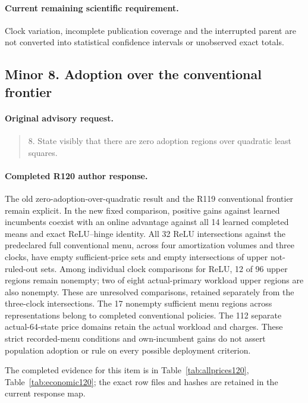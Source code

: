 \paragraph{Current remaining scientific requirement.}
Clock variation, incomplete publication coverage and the interrupted parent are not converted into statistical confidence intervals or unobserved exact totals.

\subsection{Minor 8. Adoption over the conventional frontier}
\label{response122:minor-8}

\paragraph{Original advisory request.}
\begin{quote}
8. State visibly that there are zero adoption regions over quadratic least squares.
\end{quote}

\paragraph{Completed R120 author response.}
The old zero-adoption-over-quadratic result and the R119 conventional frontier remain explicit. In the new fixed comparison, positive gains against learned incumbents coexist with an online advantage against all 14 learned completed means and exact ReLU--hinge identity. All 32 ReLU intersections against the predeclared full conventional menu, across four amortization volumes and three clocks, have empty sufficient-price sets and empty intersections of upper not-ruled-out sets. Among individual clock comparisons for ReLU, 12 of 96 upper regions remain nonempty; two of eight actual-primary workload upper regions are also nonempty. These are unresolved comparisons, retained separately from the three-clock intersections. The 17 nonempty sufficient menu regions across representations belong to completed conventional policies. The 112 separate actual-64-state price domains retain the actual workload and charges. These strict recorded-menu conditions and own-incumbent gains do not assert population adoption or rule on every possible deployment criterion.

The completed evidence for this item is in Table~\ref{tab:allprices120}, Table~\ref{tab:economic120}; the exact row files and hashes are retained in the current response map.

